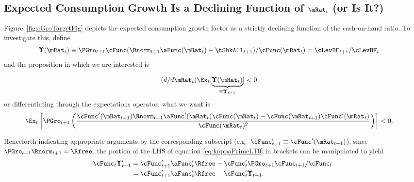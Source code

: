 \documentclass[BufferStockTheory]{subfiles}
\begin{document}
\hypertarget{dcgdxneg}{}
\subsection{Expected Consumption Growth Is a Declining Function of $\mRat_{t}$ (or Is It?)}
\label{subsec:dcgdxneg}

Figure~\ref{fig:cGroTargetFig} depicts the expected consumption growth factor as a strictly
declining function of the cash-on-hand ratio. To investigate this,
define
\begin{align*}
  \pmb{\Upsilon}(\mRat_{t})  & \equiv  \PGro_{t+1} \cFunc(\Rnorm_{t+1}\aFunc(\mRat_{t})+\tShkAll_{t+1})/\cFunc(\mRat_{t})  = \cLevBF_{t+1}/\cLevBF_{t}
\end{align*}
and the proposition in which we are interested is

\begin{align}
  (d/d\mRat_{t})\Ex_{t}[\underbrace{\pmb{\Upsilon}(\mRat_{t})}_{\equiv \pmb{\Upsilon}_{t+1}}]  & < 0  \nonumber
\end{align}
or differentiating through the expectations operator, what we want is
\begin{align}
  \Ex_{t}\left[\PGro_{t+1} \left(\frac{\cFunc^{\prime}(\mRat_{t+1})\Rnorm_{t+1}\aFunc^{\prime}(\mRat_{t})\cFunc(\mRat_{t})-\cFunc(\mRat_{t+1})\cFunc^{\prime}(\mRat_{t})}{\cFunc(\mRat_{t})^{2}}\right)\right]  & < 0 \label{eq:kappaPrimeLT0}.
\end{align}

Henceforth indicating appropriate arguments by the corresponding
subscript (e.g.\ $\cFunc_{t+1}^{\prime} \equiv \cFunc^{\prime}(\mRat_{t+1})$), since
$\PGro_{t+1}\Rnorm_{t+1}=\Rfree$, the portion of the LHS of equation \eqref{eq:kappaPrimeLT0} in brackets can be manipulated to yield
\begin{align}
  \cFunc_{t} \pmb{\Upsilon}^{\prime}_{t+1}  & = \cFunc^{\prime}_{t+1}\aFunc^{\prime}_{t}\Rfree-\cFunc^{\prime}_{t} \PGro_{t+1} \cFunc_{t+1}/\cFunc_{t} \nonumber
  \\  & = \cFunc^{\prime}_{t+1}\aFunc^{\prime}_{t}\Rfree-\cFunc^{\prime}_{t} \pmb{\Upsilon}_{t+1} \label{eq:cPrimek}
        .
\end{align}
\end{document}
